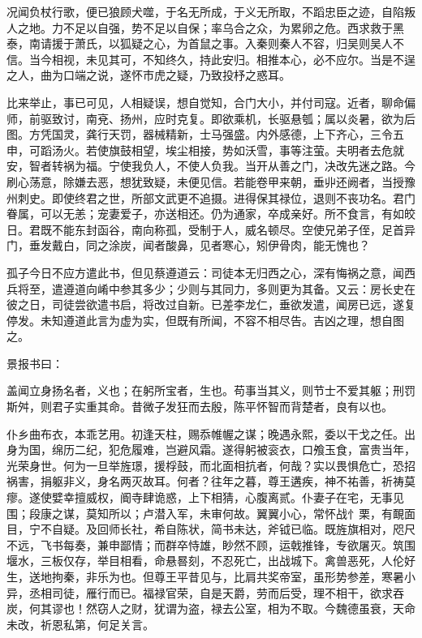 \documentclass[12pt,UTF8]{ctexbook}
\begin{document}
况闻负杖行歌，便已狼顾犬噬，于名无所成，于义无所取，不蹈忠臣之迹，自陷叛人之地。力不足以自强，势不足以自保；率乌合之众，为累卵之危。西求救于黑泰，南请援于萧氏，以狐疑之心，为首鼠之事。入秦则秦人不容，归吴则吴人不信。当今相视，未见其可，不知终久，持此安归。相推本心，必不应尔。当是不逞之人，曲为口端之说，遂怀市虎之疑，乃致投杼之惑耳。

比来举止，事已可见，人相疑误，想自觉知，合门大小，并付司寇。近者，聊命偏师，前驱致讨，南兗、扬州，应时克复。即欲乘机，长驱悬瓠；属以炎暑，欲为后图。方凭国灵，龚行天罚，器械精新，士马强盛。内外感德，上下齐心，三令五申，可蹈汤火。若使旗鼓相望，埃尘相接，势如沃雪，事等注萤。夫明者去危就安，智者转祸为福。宁使我负人，不使人负我。当开从善之门，决改先迷之路。今刷心荡意，除嫌去恶，想犹致疑，未便见信。若能卷甲来朝，垂丱还阙者，当授豫州刺史。即使终君之世，所部文武更不追摄。进得保其禄位，退则不丧功名。君门眷属，可以无恙；宠妻爱子，亦送相还。仍为通家，卒成亲好。所不食言，有如皎日。君既不能东封函谷，南向称孤，受制于人，威名顿尽。空使兄弟子侄，足首异门，垂发戴白，同之涂炭，闻者酸鼻，见者寒心，矧伊骨肉，能无愧也？

孤子今日不应方遣此书，但见蔡遵道云：司徒本无归西之心，深有悔祸之意，闻西兵将至，遣遵道向崤中参其多少；少则与其同力，多则更为其备。又云：房长史在彼之日，司徒尝欲遣书启，将改过自新。已差李龙仁，垂欲发遣，闻房已远，遂复停发。未知遵道此言为虚为实，但既有所闻，不容不相尽告。吉凶之理，想自图之。

景报书曰：

盖闻立身扬名者，义也；在躬所宝者，生也。苟事当其义，则节士不爱其躯；刑罚斯舛，则君子实重其命。昔微子发狂而去殷，陈平怀智而背楚者，良有以也。

仆乡曲布衣，本乖艺用。初逢天柱，赐忝帷幄之谋；晚遇永熙，委以干戈之任。出身为国，绵历二纪，犯危履难，岂避风霜。遂得躬被衮衣，口飧玉食，富贵当年，光荣身世。何为一旦举旌璟，援桴鼓，而北面相抗者，何哉？实以畏惧危亡，恐招祸害，捐躯非义，身名两灭故耳。何者？往年之暮，尊王遘疾，神不祐善，祈祷莫瘳。遂使嬖幸擅威权，阍寺肆诡惑，上下相猜，心腹离贰。仆妻子在宅，无事见围；段康之谋，莫知所以；卢潜入军，未审何故。翼翼小心，常怀战忄栗，有靦面目，宁不自疑。及回师长社，希自陈状，简书未达，斧钺已临。既旌旗相对，咫尺不远，飞书每奏，兼申鄙情；而群卒恃雄，眇然不顾，运戟推锋，专欲屠灭。筑围堰水，三板仅存，举目相看，命悬晷刻，不忍死亡，出战城下。禽兽恶死，人伦好生，送地拘秦，非乐为也。但尊王平昔见与，比肩共奖帝室，虽形势参差，寒暑小异，丞相司徒，雁行而已。福禄官荣，自是天爵，劳而后受，理不相干，欲求吞炭，何其谬也！然窃人之财，犹谓为盗，禄去公室，相为不取。今魏德虽衰，天命未改，祈恩私第，何足关言。
\end{document}
